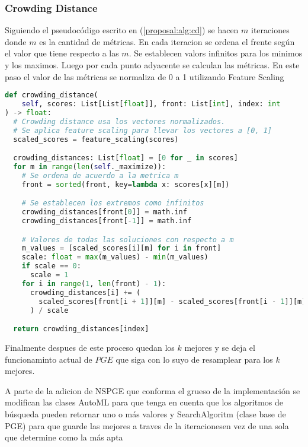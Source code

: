 \subsubsection{Crowding Distance}
Siguiendo el pseudoc\'odigo escrito en (\ref{proposal:alg:cd}) se hacen $m$ iteraciones donde $m$ es la cantidad de m\'etricas. En cada iteracion se ordena el frente seg\'un el valor que tiene respecto a las $m$. Se establecen valors infinitos para los minimos y los maximos. Luego por cada punto adyacente se calculan las m\'etricas. En este paso el valor de las m\'etricas se normaliza de 0 a 1 utilizando Feature Scaling 


\begin{lstlisting}[language=Python]
def crowding_distance(
    self, scores: List[List[float]], front: List[int], index: int
) -> float:
  # Crowding distance usa los vectores normalizados.
  # Se aplica feature scaling para llevar los vectores a [0, 1]
  scaled_scores = feature_scaling(scores)

  crowding_distances: List[float] = [0 for _ in scores]
  for m in range(len(self._maximize)):
    # Se ordena de acuerdo a la metrica m
    front = sorted(front, key=lambda x: scores[x][m])

    # Se establecen los extremos como infinitos
    crowding_distances[front[0]] = math.inf
    crowding_distances[front[-1]] = math.inf

    # Valores de todas las soluciones con respecto a m 
    m_values = [scaled_scores[i][m] for i in front]
    scale: float = max(m_values) - min(m_values)
    if scale == 0:
      scale = 1
    for i in range(1, len(front) - 1):
      crowding_distances[i] += (
        scaled_scores[front[i + 1]][m] - scaled_scores[front[i - 1]][m]
      ) / scale

  return crowding_distances[index]
\end{lstlisting}

Finalmente despues de este proceso quedan los $k$ mejores y se deja el funcionaminto actual de $PGE$ que siga con lo suyo de resamplear para los $k$ mejores.

A parte de la adicion de NSPGE que conforma el grueso de la implementaci\'on se modifican las clases AutoML para que tenga en cuenta que los algoritmos de b\'usqueda pueden retornar uno o m\'as valores y SearchAlgoritm (clase base de PGE) para que guarde las mejores a traves de la iteracionesen vez de una sola que determine como la m\'as apta



